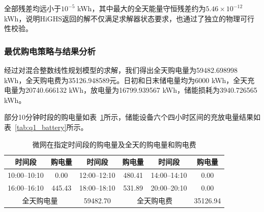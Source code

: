 \documentclass[UTF8]{ctexart}
\begin{document}
    全部残差均远小于$10^{-5}$ kWh，其中最大的全天能量守恒残差约为$5.46\times10^{-12}$ kWh，说明HiGHS返回的解不仅满足求解器状态要求，也通过了独立的物理可行性校验。\par
    
    \subsubsection{最优购电策略与结果分析}
    
    经过对混合整数线性规划模型的求解，我们得出全天购电量为59482.698998 kWh，全天购电费为35126.948589元。日初和日末储电量均为6000 kWh，全天充电量为20740.666132 kWh，放电量为16799.939567 kWh，储能损耗为3940.726565 kWh。\par
    
    部分10分钟时段的购电量如表~\ref{tab:q1_tenminute}所示，储能设备六个四小时区间的充放电量结果如表~\ref{tab:q1_battery}所示。
    
    \begin{table}[htbp]
        \centering
        \caption{微网在指定时间段的购电量及全天的购电量和购电费}
        \label{tab:q1_tenminute}
        
        \begin{tabular}{cccccc}
            \toprule
            时间段 & 购电量 & 时间段 & 购电量 & 时间段 & 购电量 \\
            \midrule
            
            10:00--10:10 & 0.00 &
            12:00--12:10 & 480.41 &
            14:00--14:10 & 0.00 \\
            
            16:00--16:10 & 445.43 &
            18:00--18:10 & 531.89 &
            20:00--20:10 & 0.00 \\
            
            \midrule
            
            \multicolumn{2}{c}{全天购电量} &
            59482.70 &
            \multicolumn{2}{c}{全天购电费} &
            35126.94 \\
            
            \bottomrule
        \end{tabular}
    \end{table}
    
\end{document}
